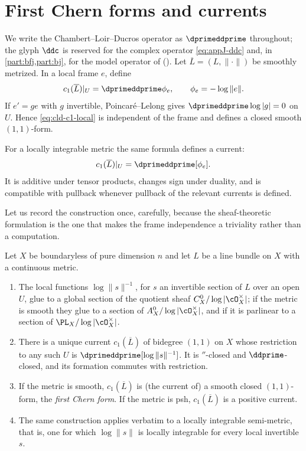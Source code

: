 \section{First Chern forms and currents}
\label{sec:ch17-chern}

We write the Chambert--Loir--Ducros operator as $\dprimeddprime$ throughout;
the glyph $\ddc$ is reserved for the complex operator
\eqref{eq:appJ-ddc} and, in \cref{part:bfj,part:bj}, for the model operator
of  ().
Let $\overline L=(L,\|\cdot\|)$ be smoothly metrized.  In a local frame
$e$, define
\begin{equation}
             c_1(\overline L)|_U=\dprimeddprime\phi_e,
             \qquad \phi_e=-\log\|e\|.
\label{eq:cld-c1-local}
\end{equation}
If $e'=ge$ with $g$ invertible, Poincar\'e--Lelong gives
$\dprimeddprime\log|g|=0$ on $U$.  Hence
\eqref{eq:cld-c1-local} is independent of the frame and defines a closed
smooth $(1,1)$-form.

For a locally integrable metric the same formula defines a current:
\[
                   c_1(\overline L)|_U=\dprimeddprime[\phi_e].
\]
It is additive under tensor products, changes sign under duality, and is
compatible with pullback whenever pullback of the relevant currents is
defined.

Let us record the construction once, carefully, because the sheaf-theoretic
formulation is the one that makes the frame independence a triviality rather
than a computation.

\begin{proposition}
\label{prop:ch17-c1-construction}
Let $X$ be boundaryless of pure dimension $n$ and let $L$ be a line
bundle on $X$ with a continuous metric.
\begin{enumerate}
\item\label{itm:ch17-c1:section}
 The local functions $\log\|s\|^{-1}$, for $s$ an invertible section of
 $L$ over an open $U$, glue to a global section of the quotient sheaf
 $C^0_X/\log|\cO_X^\times|$; if the metric is smooth they glue to a
 section of $A^0_X/\log|\cO_X^\times|$, and if it is parlinear to a
 section of $\PL_X/\log|\cO_X^\times|$.
\item\label{itm:ch17-c1:current}
 There is a unique current $c_1(\overline L)$ of bidegree $(1,1)$ on
 $X$ whose restriction to any such $U$ is
 $\dprimeddprime[\log\|s\|^{-1}]$.  It is $\dprime$-closed and
 $\ddprime$-closed, and its formation commutes with restriction.
\item\label{itm:ch17-c1:regularity}
 If the metric is smooth, $c_1(\overline L)$ is (the current of) a smooth
 closed $(1,1)$-form, the \emph{first Chern form}.  If the metric is psh,
 $c_1(\overline L)$ is a positive current.
\item\label{itm:ch17-c1:seminorm}
 The same construction applies verbatim to a locally integrable
 semi-metric, that is, one for which $\log\|s\|$ is locally integrable for
 every local invertible $s$.
\end{enumerate}
\end{proposition}

